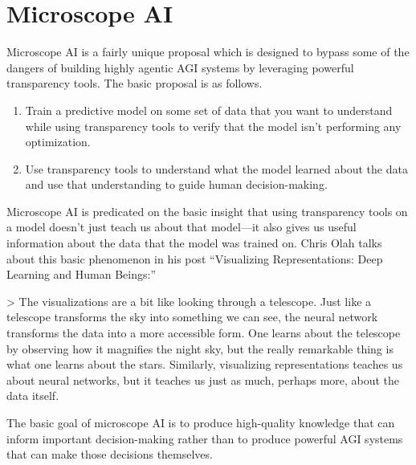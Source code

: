 \documentclass[
  onecolumn,
  natbib,
]{miri-tech-article}
\begin{document}
\section{Microscope AI}
\label{sec:5}

Microscope AI\cite{TODO: cite https://www.alignmentforum.org/posts/X2i9dQQK3gETCyqh2/chris-olah-s-views-on-agi-safety} is a fairly unique proposal which is designed to bypass some of the dangers of building highly agentic AGI systems by leveraging powerful transparency tools. The basic proposal is as follows.

\begin{enumerate}
\item Train a predictive model on some set of data that you want to understand while using transparency tools to verify that the model isn't performing any optimization.
\item Use transparency tools to understand what the model learned about the data and use that understanding to guide human decision-making.
\end{enumerate}

Microscope AI is predicated on the basic insight that using transparency tools on a model doesn't just teach us about that model---it also gives us useful information about the data that the model was trained on. Chris Olah talks about this basic phenomenon in his post ``Visualizing Representations: Deep Learning and Human Beings\cite{TODO: cite https://colah.github.io/posts/2015-01-Visualizing-Representations/}:''

> The visualizations are a bit like looking through a telescope. Just like a telescope transforms the sky into something we can see, the neural network transforms the data into a more accessible form. One learns about the telescope by observing how it magnifies the night sky, but the really remarkable thing is what one learns about the stars. Similarly, visualizing representations teaches us about neural networks, but it teaches us just as much, perhaps more, about the data itself.

The basic goal of microscope AI is to produce high-quality knowledge that can inform important decision-making rather than to produce powerful AGI systems that can make those decisions themselves.
\end{document}

